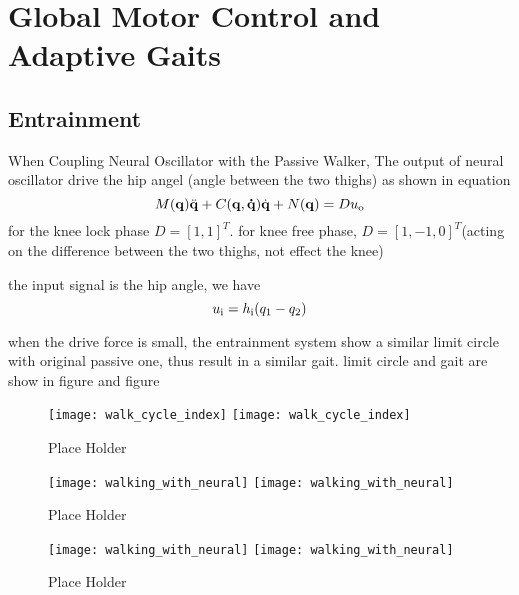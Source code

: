 \section{Global Motor Control and Adaptive Gaits}

\subsection{Entrainment}

When Coupling Neural Oscillator with the Passive Walker,
The output of neural oscillator drive the hip angel (angle between the two thighs)
as shown in equation
\begin{equation}
M(\mathbf{q}) \ddot{\mathbf{q}} + C(\mathbf{q,\dot{q}})\dot{\mathbf{q}} + N(\mathbf{q}) = Du_{\mathrm{o}}
\end{equation}
for the knee lock phase $D=[1,1]^T$.
for knee free phase, $D=[1,-1,0]^T$(acting on the difference between the two thighs, not effect the knee)

the input signal is the hip angle,
we have 
\[
	u_{\mathrm{i}}=h_{\mathrm{i}}(q_1-q_2)
\]

when the drive force is small, the entrainment system show a similar limit circle with original passive one,
thus result in a similar gait.
limit circle and gait are show in figure and figure 

\begin{figure}[!htbp]
  \begin{center}
    \leavevmode
    \ifpdf
      \texttt{[image: walk\_cycle\_index]}
    \else
      \texttt{[image: walk\_cycle\_index]}
    \fi
    \caption{Place Holder}
    \label{fig:Passive And Entraintment Walking Comparation}
\end{center}
\end{figure}

\begin{figure}[!htbp]
  \begin{center}
    \leavevmode
    \ifpdf
      \texttt{[image: walking\_with\_neural]}
    \else
      \texttt{[image: walking\_with\_neural]}
    \fi
    \caption{Place Holder}
    \label{fig:passivegait}
\end{center}
\end{figure}

\begin{figure}[!htbp]
  \begin{center}
    \leavevmode
    \ifpdf
      \texttt{[image: walking\_with\_neural]}
    \else
      \texttt{[image: walking\_with\_neural]}
    \fi
    \caption{Place Holder}
    \label{fig:entrainmentgait}
\end{center}
\end{figure}



